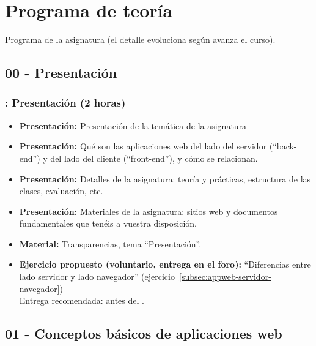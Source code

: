 \documentclass[a4paper,12pt]{article}
\begin{document}
\section{Programa de teoría}

Programa de la asignatura (el detalle evoluciona según avanza el curso).

\subsection{00 - Presentación}

\subsubsection{\juevesAa: Presentación  (2 horas)}
\label{cal:juevesAa}

\begin{itemize}
\item \textbf{Presentación:} Presentación de la temática de la asignatura
\item \textbf{Presentación:} Qué son las aplicaciones web del lado del servidor (``back-end'') y del lado del cliente (``front-end''), y cómo se relacionan.
\item \textbf{Presentación:} Detalles de la asignatura: teoría y prácticas, estructura de las clases, evaluación, etc.
\item \textbf{Presentación:} Materiales de la asignatura: sitios web y documentos fundamentales que tenéis a vuestra disposición.
\item \textbf{Material:} Transparencias, tema ``Presentación''.
\item \textbf{Ejercicio propuesto (voluntario, entrega en el foro):} ``Diferencias entre lado servidor y lado navegador'' (ejercicio~\ref{subsec:appweb-servidor-navegador}) \\
  Entrega recomendada: antes del \juevesB.
\end{itemize}


\subsection{01 - Conceptos básicos de aplicaciones web}
\end{document}
